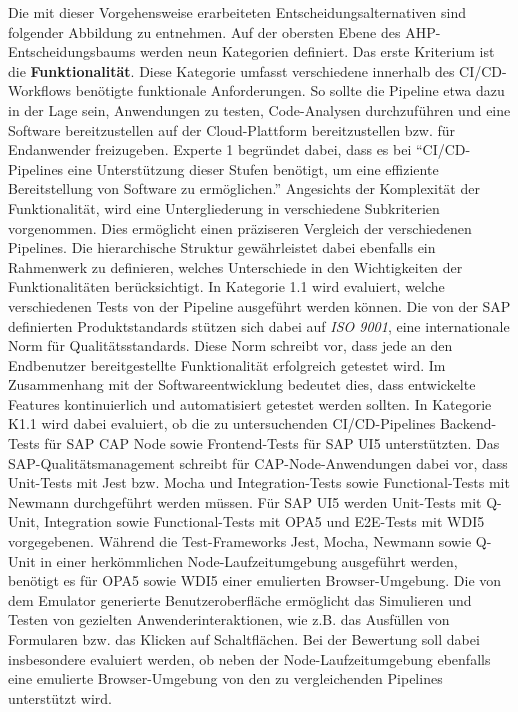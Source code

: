  Die mit dieser Vorgehensweise erarbeiteten Entscheidungsalternativen sind folgender Abbildung zu entnehmen. Auf der obersten Ebene des AHP-Entscheidungsbaums werden neun Kategorien definiert. Das erste Kriterium ist die \textbf{Funktionalität}. Diese Kategorie umfasst verschiedene innerhalb des CI/CD-Workflows benötigte funktionale Anforderungen. So sollte die Pipeline etwa dazu in der Lage sein, Anwendungen zu testen, Code-Analysen durchzuführen und eine Software bereitzustellen auf der Cloud-Plattform bereitzustellen bzw. für Endanwender freizugeben. Experte 1 begründet dabei, dass es bei \enquote{CI/CD-Pipelines eine Unterstützung dieser Stufen benötigt, um eine effiziente Bereitstellung von Software zu ermöglichen.} Angesichts der Komplexität der Funktionalität, wird eine Untergliederung in verschiedene Subkriterien vorgenommen. Dies ermöglicht einen präziseren Vergleich der verschiedenen Pipelines. Die hierarchische Struktur gewährleistet dabei ebenfalls ein Rahmenwerk zu definieren, welches Unterschiede in den Wichtigkeiten der Funktionalitäten berücksichtigt. In Kategorie 1.1 wird evaluiert, welche verschiedenen Tests von der Pipeline ausgeführt werden können. Die von der SAP definierten Produktstandards stützen sich dabei auf \textit{ISO 9001}, eine internationale Norm für Qualitätsstandards. Diese Norm schreibt vor, dass jede an den Endbenutzer bereitgestellte Funktionalität erfolgreich getestet wird. Im Zusammenhang mit der Softwareentwicklung bedeutet dies, dass entwickelte Features kontinuierlich und automatisiert getestet werden sollten. In Kategorie K1.1 wird dabei evaluiert, ob die zu untersuchenden CI/CD-Pipelines Backend-Tests für SAP CAP Node sowie Frontend-Tests für SAP UI5 unterstützten. Das SAP-Qualitätsmanagement schreibt für CAP-Node-Anwendungen dabei vor, dass Unit-Tests mit Jest bzw. Mocha und Integration-Tests sowie Functional-Tests mit Newmann durchgeführt werden müssen. Für SAP UI5 werden Unit-Tests mit Q-Unit, Integration sowie Functional-Tests mit OPA5 und E2E-Tests mit WDI5 vorgegebenen. Während die Test-Frameworks Jest, Mocha, Newmann sowie Q-Unit in einer herkömmlichen Node-Laufzeitumgebung ausgeführt werden, benötigt es für OPA5 sowie WDI5 einer emulierten Browser-Umgebung. Die von dem Emulator generierte Benutzeroberfläche ermöglicht das Simulieren und Testen von gezielten Anwenderinteraktionen, wie z.B. das Ausfüllen von Formularen bzw. das Klicken auf Schaltflächen. Bei der Bewertung soll dabei insbesondere evaluiert werden, ob neben der Node-Laufzeitumgebung ebenfalls eine emulierte Browser-Umgebung von den zu vergleichenden Pipelines unterstützt wird. 
